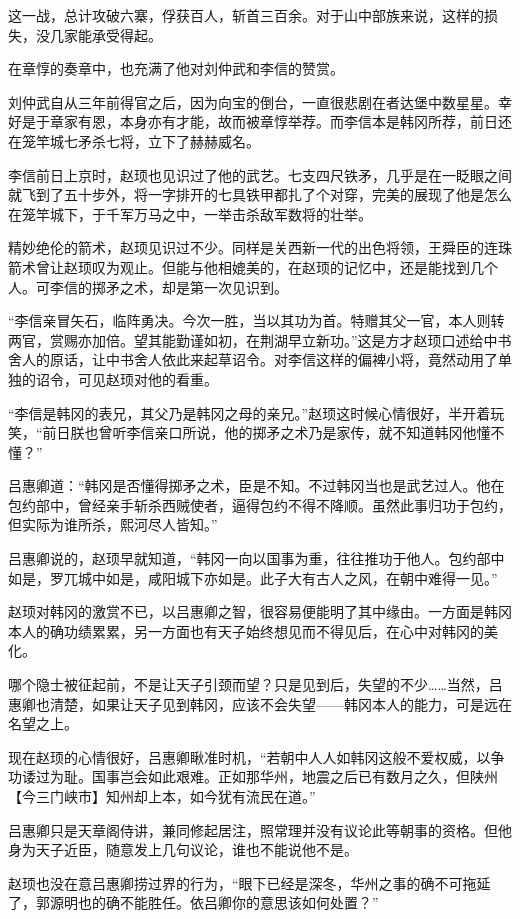 这一战，总计攻破六寨，俘获百人，斩首三百余。对于山中部族来说，这样的损失，没几家能承受得起。

在章惇的奏章中，也充满了他对刘仲武和李信的赞赏。

刘仲武自从三年前得官之后，因为向宝的倒台，一直很悲剧在者达堡中数星星。幸好是于章家有恩，本身亦有才能，故而被章惇举荐。而李信本是韩冈所荐，前日还在笼竿城七矛杀七将，立下了赫赫威名。

李信前日上京时，赵顼也见识过了他的武艺。七支四尺铁矛，几乎是在一眨眼之间就飞到了五十步外，将一字排开的七具铁甲都扎了个对穿，完美的展现了他是怎么在笼竿城下，于千军万马之中，一举击杀敌军数将的壮举。

精妙绝伦的箭术，赵顼见识过不少。同样是关西新一代的出色将领，王舜臣的连珠箭术曾让赵顼叹为观止。但能与他相媲美的，在赵顼的记忆中，还是能找到几个人。可李信的掷矛之术，却是第一次见识到。

“李信亲冒矢石，临阵勇决。今次一胜，当以其功为首。特赠其父一官，本人则转两官，赏赐亦加倍。望其能勤谨如初，在荆湖早立新功。”这是方才赵顼口述给中书舍人的原话，让中书舍人依此来起草诏令。对李信这样的偏裨小将，竟然动用了单独的诏令，可见赵顼对他的看重。

“李信是韩冈的表兄，其父乃是韩冈之母的亲兄。”赵顼这时候心情很好，半开着玩笑，“前日朕也曾听李信亲口所说，他的掷矛之术乃是家传，就不知道韩冈他懂不懂？”

吕惠卿道：“韩冈是否懂得掷矛之术，臣是不知。不过韩冈当也是武艺过人。他在包约部中，曾经亲手斩杀西贼使者，逼得包约不得不降顺。虽然此事归功于包约，但实际为谁所杀，熙河尽人皆知。”

吕惠卿说的，赵顼早就知道，“韩冈一向以国事为重，往往推功于他人。包约部中如是，罗兀城中如是，咸阳城下亦如是。此子大有古人之风，在朝中难得一见。”

赵顼对韩冈的激赏不已，以吕惠卿之智，很容易便能明了其中缘由。一方面是韩冈本人的确功绩累累，另一方面也有天子始终想见而不得见后，在心中对韩冈的美化。

哪个隐士被征起前，不是让天子引颈而望？只是见到后，失望的不少……当然，吕惠卿也清楚，如果让天子见到韩冈，应该不会失望——韩冈本人的能力，可是远在名望之上。

现在赵顼的心情很好，吕惠卿瞅准时机，“若朝中人人如韩冈这般不爱权威，以争功诿过为耻。国事岂会如此艰难。正如那华州，地震之后已有数月之久，但陕州【今三门峡市】知州却上本，如今犹有流民在道。”

吕惠卿只是天章阁侍讲，兼同修起居注，照常理并没有议论此等朝事的资格。但他身为天子近臣，随意发上几句议论，谁也不能说他不是。

赵顼也没在意吕惠卿捞过界的行为，“眼下已经是深冬，华州之事的确不可拖延了，郭源明也的确不能胜任。依吕卿你的意思该如何处置？”

